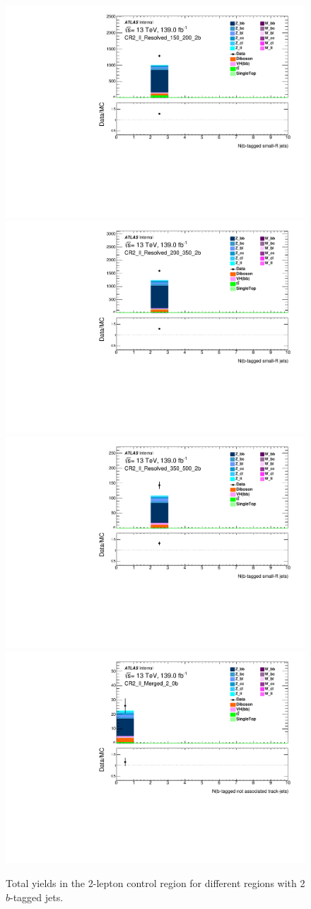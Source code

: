 \begin{figure}[!htb]
    \includegraphics[width=0.46\linewidth]{chapters/c8/figures/2L/DataMC_MonoH_Nominal_CR2_ll_Resolved_150_200_2b_N_BJets_04.pdf}
    \includegraphics[width=0.46\linewidth]{chapters/c8/figures/2L/DataMC_MonoH_Nominal_CR2_ll_Resolved_200_350_2b_N_BJets_04.pdf}\\
    \includegraphics[width=0.46\linewidth]{chapters/c8/figures/2L/DataMC_MonoH_Nominal_CR2_ll_Resolved_350_500_2b_N_BJets_04.pdf}
    \includegraphics[width=0.46\linewidth]{chapters/c8/figures/2L/DataMC_MonoH_Nominal_CR2_ll_Merged_2_0b_N_BTags_not_associated_02.pdf}
    \caption{Total yields in the 2-lepton control region for different \met regions with 2 $b$-tagged jets.}
    \label{fig:data-mc-2l-ll-nb-2b}
\end{figure}
  
